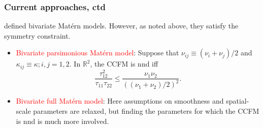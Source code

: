 \documentclass{beamer}
\begin{document}

\begin{frame}
\frametitle{Current approaches, ctd}
\cite{Gneitingetal2010} defined bivariate Mat\'{e}rn models. However, as noted above, they satisfy the symmetry constraint.
\begin{itemize}
\item \textcolor{red}{Bivariate parsimonious Matérn model}: Suppose that $\nu_{ij}\equiv(\nu_i+\nu_j)/2$ and $\kappa_{ij}\equiv\kappa;i,j=1,2$. In $\mathbb{R}^2$, the CCFM is nnd iff
$$
\frac{\tau_{12}^2}{\tau_{11}\tau_{22}}\leq\frac{\nu_1\nu_2}{((\nu_1+\nu_2)/2)^2}.
$$



\item \textcolor{red}{Bivariate full Matérn model}:  Here assumptions on smoothness and spatial-scale parameters are relaxed, but finding the parameters for which the CCFM is nnd is much more involved.\vfill
\end{itemize}
\vfill
\end{frame}

\end{document}
